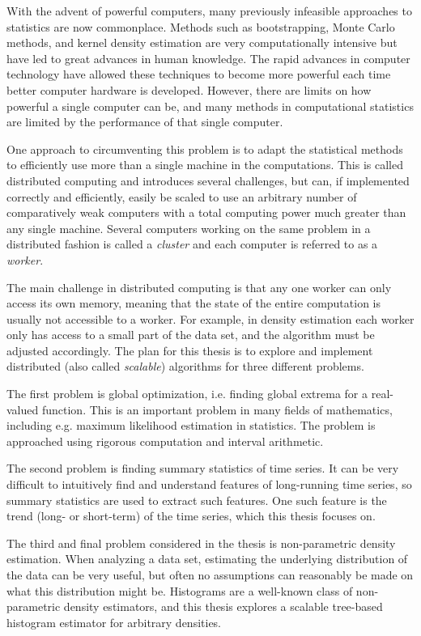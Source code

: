 \documentclass[../main.tex]{subfiles}
\begin{document}
  With the advent of powerful computers,
  many previously infeasible approaches to statistics are now commonplace.
  Methods such as bootstrapping, Monte Carlo methods, and kernel density estimation are
  very computationally intensive but have led to
  great advances in human knowledge.
  The rapid advances in computer technology have allowed these techniques to
  become more powerful each time better computer hardware is developed.
  However, there are limits on how powerful a single computer can be,
  and many methods in computational statistics are limited by the performance of that single computer.

  One approach to circumventing this problem is to adapt the statistical methods
  to efficiently use more than a single machine in the computations.
  This is called distributed computing and introduces several challenges,
  but can, if implemented correctly and efficiently,
  easily be scaled to use an arbitrary number of comparatively weak computers
  with a total computing power much greater than any single machine.
  Several computers working on the same problem in a distributed fashion
  is called a \textit{cluster} and each computer is referred to as a \textit{worker}.

  The main challenge in distributed computing is that
  any one worker can only access its own memory,
  meaning that the state of the entire computation is usually not accessible to a worker.
  For example, in density estimation each worker only
  has access to a small part of the data set, 
  and the algorithm must be adjusted accordingly.
  The plan for this thesis is to explore and implement distributed (also called \textit{scalable})
  algorithms for three different problems.

  The first problem is global optimization, i.e. finding global extrema for a real-valued function.
  This is an important problem in many fields of mathematics,
  including e.g. maximum likelihood estimation in statistics.
  The problem is approached using rigorous computation and interval arithmetic.

  The second problem is finding summary statistics of time series.
  It can be very difficult to intuitively find and understand features
  of long-running time series, so summary statistics are used to extract such features.
  One such feature is the trend (long- or short-term) of the time series, which
  this thesis focuses on.

  The third and final problem considered in the thesis is non-parametric density estimation.
  When analyzing a data set, estimating the underlying distribution of the data can be very useful,
  but often no assumptions can reasonably be made on what this distribution might be.
  Histograms are a well-known class of non-parametric density estimators,
  and this thesis explores a scalable tree-based histogram estimator for arbitrary densities.
\end{document}
